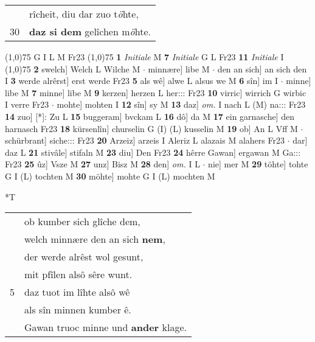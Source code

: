 \documentclass[8pt,a4paper,notitlepage]{article}
\begin{document}
\begin{table}[ht]
\begin{minipage}[t]{0.5\linewidth}
\begin{tabular}{rl}
 & rîcheit, diu dar zuo t\textit{ö}hte,\\ 
30 & \textbf{daz si dem} gelîchen m\textit{ö}hte.\\ 
\end{tabular}
\scriptsize
\line(1,0){75} \newline
G I L M Fr23 \newline
\line(1,0){75} \newline
\textbf{1} \textit{Initiale} M  \textbf{7} \textit{Initiale} G L Fr23  \textbf{11} \textit{Initiale} I  \newline
\line(1,0){75} \newline
\textbf{2} swelch] Welch L Wilche M  $\cdot$ minnære] libe M  $\cdot$ den an sich] an sich den I \textbf{3} werde alrêrst] erst werde Fr23 \textbf{5} als wê] alwe L alsus we M \textbf{6} sîn] im I  $\cdot$ minne] libe M \textbf{7} minne] libe M \textbf{9} kerzen] herzen L her::: Fr23 \textbf{10} virric] wirrich G wirbic I verre Fr23  $\cdot$ mohte] mohten I \textbf{12} sîn] sy M \textbf{13} daz] \textit{om.} I nach L (M) na::: Fr23 \textbf{14} zuo] [*]: Zu L \textbf{15} buggeram] bvckam L \textbf{16} dô] da M \textbf{17} ein garnasche] den harnasch Fr23 \textbf{18} kürsenlîn] churselin G (I) (L) kusselin M \textbf{19} ob] An L Vff M  $\cdot$ schürbrant] siche::: Fr23 \textbf{20} Arzeiz] arzeis I Aleriz L alazais M alahers Fr23  $\cdot$ dar] daz L \textbf{21} stivâle] stifaln M \textbf{23} diu] Den Fr23 \textbf{24} hêrre Gawan] ergawan M Ga::: Fr23 \textbf{25} ûz] Vsze M \textbf{27} unz] Bisz M \textbf{28} den] \textit{om.} I L  $\cdot$ nie] mer M \textbf{29} töhte] tohte G I (L) tochten M \textbf{30} möhte] mohte G I (L) mochten M \newline
\end{minipage}
\hspace{0.5cm}
\begin{minipage}[t]{0.5\linewidth}
\small
\begin{center}*T
\end{center}
\begin{tabular}{rl}
 & ob kumber sich glîche dem,\\ 
 & welch minnære den an sich \textbf{nem},\\ 
 & der werde alrêst wol gesunt,\\ 
 & mit pfîlen alsô sêre wunt.\\ 
5 & daz tuot im lîhte alsô wê\\ 
 & als sîn minnen kumber ê.\\ 
 & Gawan truoc minne und \textbf{ander} klage.\\ 

\end{tabular}
\end{minipage}
\end{table}
\end{document}
